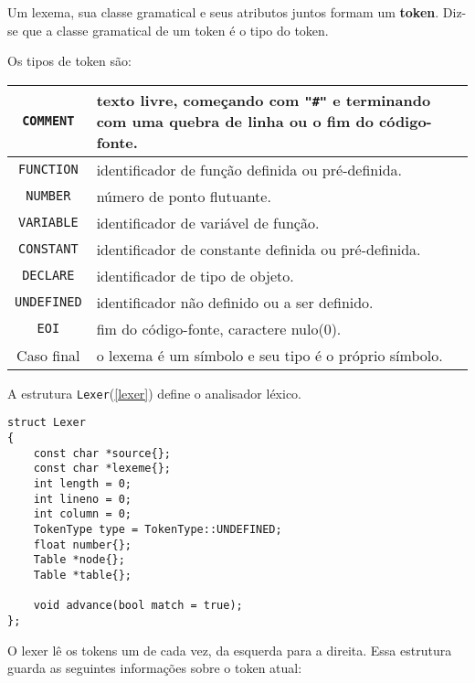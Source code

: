 Um lexema, sua classe gramatical e seus atributos juntos formam um \textbf{token}.
Diz-se que a classe gramatical de um token é o tipo do token.

Os tipos de token são:

\begin{centering}
\begin{tabularx}{\textwidth}{||c|X||}
\hline \texttt{COMMENT} & texto livre, começando com \texttt{"\#"} e
terminando com uma quebra de linha ou o fim do código-fonte.\\ 
\hline \texttt{FUNCTION} & identificador de função definida ou pré-definida.\\
\hline \texttt{NUMBER} & número de ponto flutuante.\\
\hline \texttt{VARIABLE} & identificador de variável de função.\\
\hline \texttt{CONSTANT} &identificador de constante definida ou pré-definida.\\
\hline \texttt{DECLARE} & identificador de tipo de objeto.\\
\hline \texttt{UNDEFINED} & identificador não definido ou a ser definido.\\
\hline \texttt{EOI} & fim do código-fonte, caractere nulo(0).\\
\hline Caso final & o lexema é um símbolo e seu tipo é o próprio símbolo.\\
\hline
\end{tabularx}
\end{centering}

A estrutura \texttt{Lexer}(\ref{lexer}) define o analisador léxico.
\begin{lstlisting}[label=lexer, caption=Extrutura do Lexer]
struct Lexer
{
    const char *source{};
    const char *lexeme{};
    int length = 0;
    int lineno = 0;
    int column = 0;
    TokenType type = TokenType::UNDEFINED;
    float number{};
    Table *node{};
    Table *table{};

    void advance(bool match = true);
};
\end{lstlisting}

O lexer lê os tokens um de cada vez, da esquerda para a direita.
Essa estrutura guarda as seguintes informações sobre o token atual:

